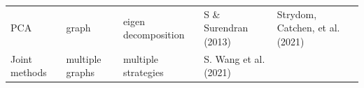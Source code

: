 \documentclass[11pt]{article}
\begin{document}
\begin{longtable}[]{@{}lllll@{}}
\begin{minipage}[t]{0.09\columnwidth}
PCA\strut
\end{minipage} & \begin{minipage}[t]{0.11\columnwidth}\raggedright
graph\strut
\end{minipage} & \begin{minipage}[t]{0.23\columnwidth}\raggedright
eigen decomposition\strut
\end{minipage} & \begin{minipage}[t]{0.14\columnwidth}\raggedright
S \& Surendran (2013)\strut
\end{minipage} & \begin{minipage}[t]{0.29\columnwidth}\raggedright
Strydom, Catchen, et al. (2021)\strut
\end{minipage}\tabularnewline
\begin{minipage}[t]{0.09\columnwidth}\raggedright
Joint methods\strut
\end{minipage} & \begin{minipage}[t]{0.11\columnwidth}\raggedright
multiple graphs\strut
\end{minipage} & \begin{minipage}[t]{0.23\columnwidth}\raggedright
multiple strategies\strut
\end{minipage} & \begin{minipage}[t]{0.14\columnwidth}\raggedright
S. Wang et al. (2021)\strut
\end{minipage} & \begin{minipage}[t]{0.29\columnwidth}\raggedright
\strut
\end{minipage}\tabularnewline
\bottomrule
\end{longtable}
\end{document}
